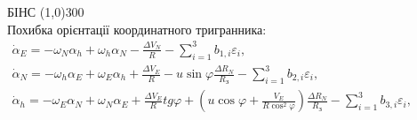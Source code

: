 \documentclass[ucs,compress]{beamer}    %
\begin{document}
\begin{frame}[ shrink=10]
\begin{block}{БІНС}
{\centering \line(1,0){300}\\}
Похибка орієнтації координатного тригранника:\\
$\label{eq:dasdins} \begin{array}{l} 
{\dot{\alpha }_{E} =-\omega_{N} \alpha_{h} +\omega_{h} \alpha_{N} -\frac{\Delta V_{N} }{R} -\sum_{i=1}^{3}b_{1,i}\varepsilon_{i} ,} \\
{\dot{\alpha }_{N} =-\omega_{h} \alpha_{E} +\omega_{E} \alpha_{h} +\frac{\Delta V_{E} }{R} -u\sin \varphi \frac{\Delta R_{N} }{R_{\text{З}} }
-\sum_{i=1}^{3}b_{2,i}  \varepsilon_{i} ,} \\ 
{\dot{\alpha }_{h} =-\omega_{E} \alpha_{N} +\omega_{N} \alpha_{E} +\frac{\Delta V_{E} }{R} tg\varphi +(u\cos \varphi +\frac{V_{E} }{R\cos ^{2} \varphi } )
\frac{\Delta R_{N} }{R_{\text{З}} } -\sum_{i=1}^{3}b_{3,i}\varepsilon_{i} ,} \end{array} $
\end{block}
\end{frame}

\end{document}
